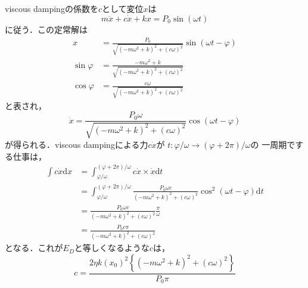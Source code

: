 \documentclass[a4paper]{jsarticle}
\begin{document}
\subsection{}
viscous dampingの係数を$c$として変位$x$は
\begin{equation}
  m \ddot{x} + c \dot{x} + k x = P_0 \sin (\omega t)
\end{equation}
に従う．この定常解は
\begin{align}
  x            & = \frac{P_0}{\sqrt{(-m \omega^2 + k)^2 + (c \omega)^2}}
  \sin (\omega t - \varphi)                                                          \\
  \sin \varphi & = \frac{-m \omega^2 + k}{\sqrt{(-m \omega^2 + k)^2 + (c \omega)^2}} \\
  \cos \varphi & = \frac{c \omega}{\sqrt{(-m \omega^2 + k)^2 + (c \omega)^2}}
\end{align}
と表され，
\begin{equation}
  \dot{x} = \frac{P_0 \omega}{\sqrt{(-m \omega^2 + k)^2 + (c \omega)^2}} \cos (\omega t - \varphi)
\end{equation}
が得られる．viscous dampingによる力$c \dot{x}$が
$t: \varphi/\omega \rightarrow (\varphi + 2 \pi) / \omega$の
一周期でする仕事は，
\begin{equation}
  \begin{aligned}
    \int c \dot{x} \mathrm{d} x
     & = \int_{\varphi / \omega}^{(\varphi + 2 \pi) / \omega}
    c \dot{x} \times \dot{x} \mathrm{d} t                                           \\
     & =\int_{\varphi / \omega}^{(\varphi + 2 \pi) / \omega}
    \frac{P_0 \omega c}{(-m \omega^2 + k)^2 + (c \omega)^2}
    \cos^2 (\omega t - \varphi) \mathrm{d} t                                        \\
     & = \frac{P_0 \omega c}{(-m \omega^2 + k)^2 + (c \omega)^2} \frac{\pi}{\omega} \\
     & = \frac{P_0 c \pi}{(-m \omega^2 + k)^2 + (c \omega)^2}
  \end{aligned}
\end{equation}
となる．これが$E_D$と等しくなるような$c$は，
\begin{equation}
  \label{eq:eta_to_c}
  c = \frac{2 \eta k \left(x_0\right)^2
    \left\{(-m \omega^2 + k)^2 + (c \omega)^2\right\}}{P_0 \pi}
\end{equation}
\end{document}
